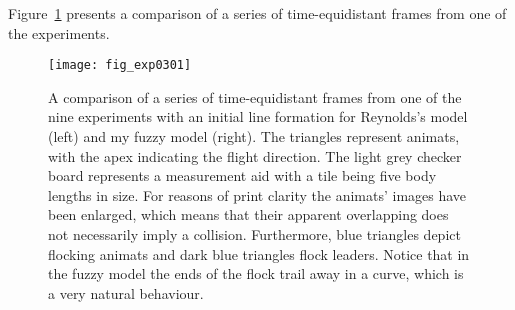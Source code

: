 Figure~\ref{fig:exp:03:01} presents a comparison of a series of time-equidistant frames from one of the experiments.
%
\begin{figure}[!ht]
  \null\vspace*{1mm}
  \texttt{[image: fig\_exp0301]}
  \par\vspace*{1mm}
  \caption{A comparison of a series of time-equidistant frames from one of the nine experiments with an initial line formation for Reynolds's model \cite{reynolds:1999} (left) and my fuzzy model (right). The triangles represent animats, with the apex indicating the flight direction. The light grey checker board represents a measurement aid with a tile being five body lengths in size. For reasons of print clarity the animats' images have been enlarged, which means that their apparent overlapping does not necessarily imply a collision. Furthermore, blue triangles depict flocking animats and dark blue triangles flock leaders. Notice that in the fuzzy model the ends of the flock trail away in a curve, which is a very natural behaviour.}
  \label{fig:exp:03:01}
\end{figure}
%
